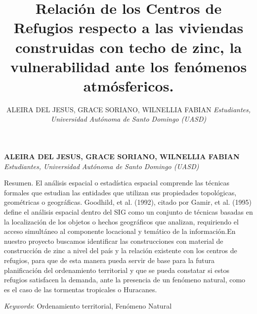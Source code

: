 \documentclass[11pt,]{article}
\title{Relación de los Centros de Refugios respecto a las viviendas construidas
con techo de zinc, la vulnerabilidad ante los fenómenos atmósfericos.  }
\author{\Large ALEIRA DEL JESUS, GRACE SORIANO, WILNELLIA FABIAN\vspace{0.05in} \newline\normalsize\emph{Estudiantes, Universidad Autónoma de Santo Domingo (UASD)}  }
\date{}
\newcommand*{\authorfont}{\fontfamily{phv}\selectfont}
\renewenvironment{abstract}
 {{%
    \setlength{\leftmargin}{0mm}
    \setlength{\rightmargin}{\leftmargin}%
  }%
  \relax}
 {\endlist}
\begin{document}
	
%

{%
\setlength{\parindent}{0pt}
\thispagestyle{plain}
{\fontsize{18}{20}\selectfont\raggedright 
\maketitle  %

}

{
   \vskip 13.5pt\relax \normalsize\fontsize{11}{12} 
\textbf{\authorfont ALEIRA DEL JESUS, GRACE SORIANO, WILNELLIA FABIAN} \hskip 15pt \emph{\small Estudiantes, Universidad Autónoma de Santo Domingo (UASD)}   

}

}








\begin{abstract}

    \hbox{\vrule height .2pt width 39.14pc}

    \vskip 8.5pt %

\noindent Resumen. El análisis espacial o estadística espacial comprende las
técnicas formales que estudian las entidades que utilizan sus
propiedades topológicas, geométricas o geográficas. Goodhild, et al.
(1992), citado por Gamir, et al. (1995) define el análisis espacial
dentro del SIG como un conjunto de técnicas basadas en la localización
de los objetos o hechos geográficos que analizan, requiriendo el acceso
simultáneo al componente locacional y temático de la información.En
nuestro proyecto buscamos identificar las construcciones con material de
construcción de zinc a nivel del país y la relación existente con los
centros de refugios, para que de esta manera pueda servir de base para
la futura planificación del ordenamiento territorial y que se pueda
constatar si estos refugios satisfacen la demanda, ante la presencia de
un fenómeno natural, como es el caso de las tormentas tropicales o
Huracanes.


\vskip 8.5pt \noindent \emph{Keywords}: Ordenamiento territorial, Fenómeno Natural \par

    \hbox{\vrule height .2pt width 39.14pc}



\end{abstract}
\end{document}
